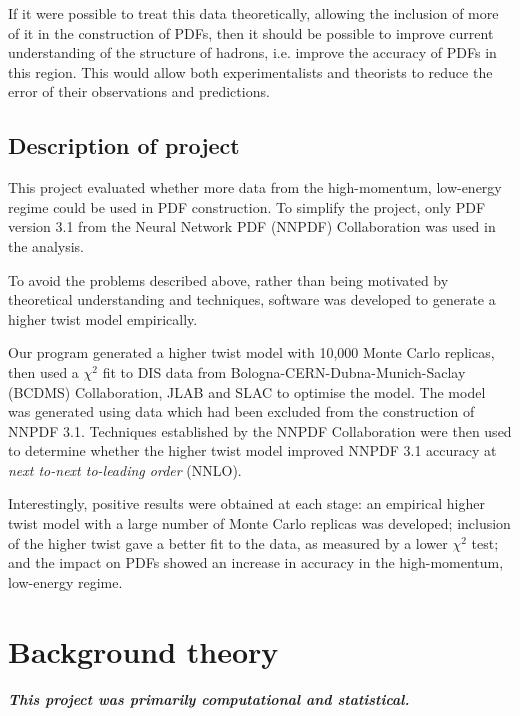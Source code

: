 \documentclass[12pt,a4paper]{report}
\begin{document}
If it were possible to treat this data theoretically, allowing the inclusion of more of it in the construction of PDFs, then it should be possible to improve current understanding of the structure of hadrons, i.e. improve the accuracy of PDFs in this region. This would allow both experimentalists and theorists to reduce the error of their observations and predictions.

\section{Description of project}

This project evaluated whether more data from the high-momentum, low-energy regime could be used in PDF construction. To simplify the project, only PDF version 3.1 from the Neural Network PDF (NNPDF) Collaboration \cite{NNPDF31} was used in the analysis.

To avoid the problems described above, rather than being motivated by theoretical understanding and techniques, software was developed to generate a higher twist model empirically.

Our program generated a higher twist model with 10,000 Monte Carlo replicas, then used a $\chi^2$ fit to DIS data from Bologna-CERN-Dubna-Munich-Saclay (BCDMS) Collaboration, JLAB and SLAC to optimise the model. The model was generated using data which had been excluded from the construction of NNPDF 3.1. Techniques established by the NNPDF Collaboration \cite{NNPDF:2010} \cite{NNPDF:2011} were then used to determine whether the higher twist model improved NNPDF 3.1 accuracy at \emph{next to-next to-leading order} (NNLO).

Interestingly, positive results were obtained at each stage: an empirical higher twist model with a large number of Monte Carlo replicas was developed; inclusion of the higher twist gave a better fit to the data, as measured by a lower $\chi^2$ test; and the impact on PDFs showed an increase in accuracy in the high-momentum, low-energy regime.

\chapter{Background theory} \label{ch:theory}

\paragraph{This project was primarily computational and statistical.}
\end{document}
